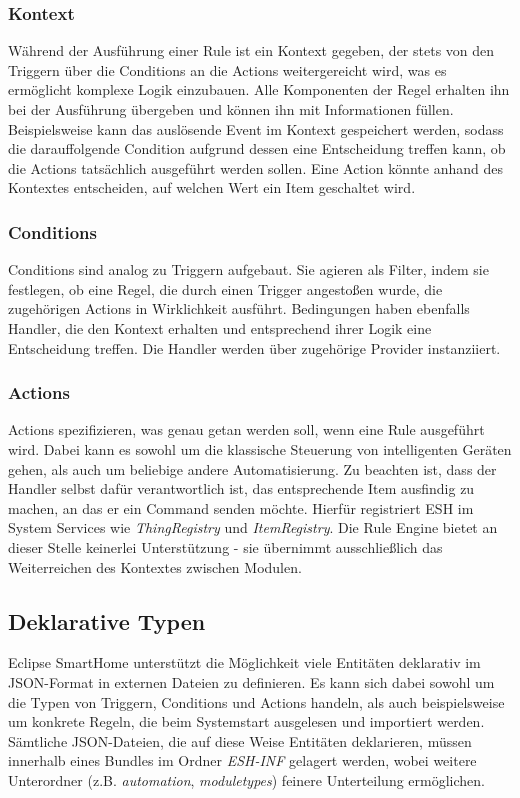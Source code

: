 \subsubsection{Kontext}
\label{subsubsec:kontext}
Während der Ausführung einer Rule ist ein Kontext gegeben, der stets von den Triggern über die Conditions an die Actions weitergereicht wird, was es ermöglicht komplexe Logik einzubauen. Alle Komponenten der Regel erhalten ihn bei der Ausführung übergeben und können ihn mit Informationen füllen. Beispielsweise kann das auslösende Event im Kontext gespeichert werden, sodass die darauffolgende Condition aufgrund dessen eine Entscheidung treffen kann, ob die Actions tatsächlich ausgeführt werden sollen. Eine Action könnte anhand des Kontextes entscheiden, auf welchen Wert ein Item geschaltet wird.

\subsubsection{Conditions}
Conditions sind analog zu Triggern aufgebaut. Sie agieren als Filter, indem sie festlegen, ob eine Regel, die durch einen Trigger angestoßen wurde, die zugehörigen Actions in Wirklichkeit ausführt. Bedingungen haben ebenfalls Handler, die den Kontext erhalten und entsprechend ihrer Logik eine Entscheidung treffen. Die Handler werden über zugehörige Provider instanziiert.

\subsubsection{Actions}
Actions spezifizieren, was genau getan werden soll, wenn eine Rule ausgeführt wird. Dabei kann es sowohl um die klassische Steuerung von intelligenten Geräten gehen, als auch um beliebige andere Automatisierung. Zu beachten ist, dass der Handler selbst dafür verantwortlich ist, das entsprechende Item ausfindig zu machen, an das er ein Command senden möchte. Hierfür registriert ESH im System Services wie \textit{ThingRegistry} und \textit{ItemRegistry}. Die Rule Engine bietet an dieser Stelle keinerlei Unterstützung - sie übernimmt ausschließlich das Weiterreichen des Kontextes zwischen Modulen.


\subsection{Deklarative Typen}
Eclipse SmartHome unterstützt die Möglichkeit viele Entitäten deklarativ im JSON-Format in externen Dateien zu definieren. Es kann sich dabei sowohl um die Typen von Triggern, Conditions und Actions handeln, als auch beispielsweise um konkrete Regeln, die beim Systemstart ausgelesen und importiert werden. Sämtliche JSON-Dateien, die auf diese Weise Entitäten deklarieren, müssen innerhalb eines Bundles im Ordner \textit{ESH-INF} gelagert werden, wobei weitere Unterordner (z.B. \textit{automation}, \textit{moduletypes}) feinere Unterteilung ermöglichen. \\

